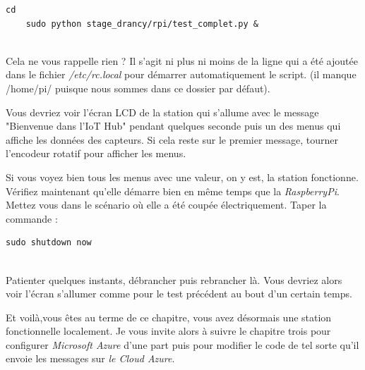 \begin{lstlisting}[style=MyBashStyle]
	cd
	sudo python stage_drancy/rpi/test_complet.py &
\end{lstlisting}\\

Cela ne vous rappelle rien ? Il s'agit ni plus ni moins de la ligne qui a été ajoutée dans le fichier \textit{/etc/rc.local} pour démarrer automatiquement le script. (il manque /home/pi/ puisque nous sommes dans ce dossier par défaut).

Vous devriez voir l'écran LCD de la station qui s'allume avec le message "Bienvenue dans l'IoT Hub" pendant quelques seconde puis un des menus qui affiche les données des capteurs. Si cela reste sur le premier message, tourner l'encodeur rotatif pour afficher les menus.

Si vous voyez bien tous les menus avec une valeur, on y est, la station fonctionne. Vérifiez maintenant qu'elle démarre bien en même temps que la \textit{RaspberryPi}.
Mettez vous dans le scénario où elle a été coupée électriquement. 
Taper la commande :\\ %

\begin{lstlisting}[style=MyBashStyle]
	sudo shutdown now
\end{lstlisting}\\

Patienter quelques instants, débrancher puis rebrancher là. Vous devriez alors voir l'écran s'allumer comme pour le test précédent au bout d'un certain temps. %

Et voilà,vous êtes au terme de ce chapitre, vous avez désormais une station fonctionnelle localement. Je vous invite alors à suivre le chapitre trois pour configurer \textit{Microsoft Azure} d'une part puis pour modifier le code de tel sorte qu'il envoie les messages sur \textit{le Cloud Azure}.



	
	
